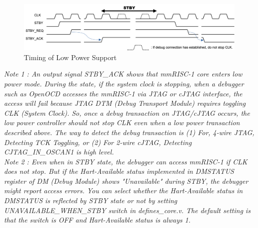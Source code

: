 \begin{figure}[H]
    \includegraphics[width=1.00\columnwidth]{./Figure/LowPowerTiming.png}
    \caption{Timing of Low Power Support}
    \label{fig:LOWPOWERTIMING}
\end{figure}

\it{Note 1 : An output signal STBY\_ACK shows that mmRISC-1 core enters low power mode. During the state, if the system clock is stopping, when a debugger such as OpenOCD accesses the mmRISC-1 via JTAG or cJTAG interface, the access will fail because JTAG DTM (Debug Transport Module) requires toggling CLK (System Clock). So, once a debug transaction on JTAG/cJTAG occurs, the low power controller should not stop CLK even when a low power transaction described above. The way to detect the debug transaction is (1) For, 4-wire JTAG, Detecting TCK Toggling, or (2) For 2-wire cJTAG, Detecting CJTAG\_IN\_OSCAN1 is high level.}\rm\\

\it{Note 2 : Even when in STBY state, the debugger can access mmRISC-1 if CLK does not stop. But if the Hart-Available status implemented in DMSTATUS register of DM (Debug Module) shows "Unavailable" during STBY, the debugger might report access errors. You can select whether the Hart-Available status in DMSTATUS is reflected by STBY state or not by setting UNAVAILABLE\_WHEN\_STBY switch in defines\_core.v. The default setting is that the switch is OFF and Hart-Available status is always 1.}\rm{}


